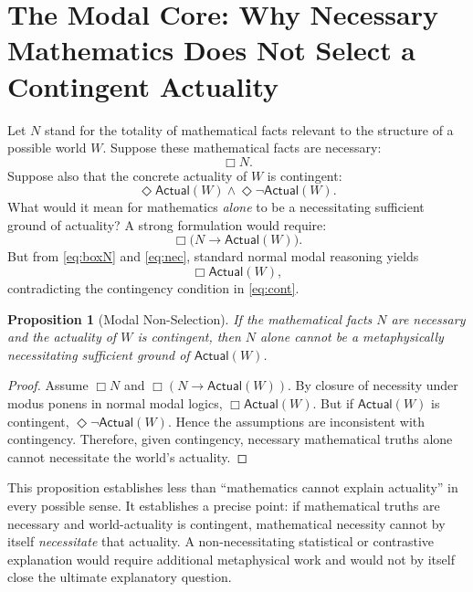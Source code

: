 \documentclass[11pt,letterpaper]{article}
\theoremstyle{plain}
\newtheorem{proposition}{Proposition}
\theoremstyle{definition}
\newcommand{\Actual}{\mathsf{Actual}}
\begin{document}
\section{The Modal Core: Why Necessary Mathematics Does Not Select a Contingent Actuality}
\label{sec:modalcore}

Let $N$ stand for the totality of mathematical facts relevant to the structure of a possible world $W$. Suppose these mathematical facts are necessary:
\begin{equation}\label{eq:boxN}
  \Box N.
\end{equation}
Suppose also that the concrete actuality of $W$ is contingent:
\begin{equation}\label{eq:cont}
  \Diamond \Actual(W) \land \Diamond \neg \Actual(W).
\end{equation}
What would it mean for mathematics \emph{alone} to be a necessitating sufficient ground of actuality? A strong formulation would require:
\begin{equation}\label{eq:nec}
  \Box\bigl(N \to \Actual(W)\bigr).
\end{equation}
But from \eqref{eq:boxN} and \eqref{eq:nec}, standard normal modal reasoning yields
\[
  \Box \Actual(W),
\]
contradicting the contingency condition in \eqref{eq:cont}.

\begin{proposition}[Modal Non-Selection]\label{prop:nonselection}
If the mathematical facts $N$ are necessary and the actuality of $W$ is contingent, then $N$ alone cannot be a metaphysically necessitating sufficient ground of $\Actual(W)$.
\end{proposition}

\begin{proof}
Assume $\Box N$ and $\Box(N \to \Actual(W))$. By closure of necessity under modus ponens in normal modal logics, $\Box \Actual(W)$. But if $\Actual(W)$ is contingent, $\Diamond \neg \Actual(W)$. Hence the assumptions are inconsistent with contingency. Therefore, given contingency, necessary mathematical truths alone cannot necessitate the world's actuality.
\end{proof}

This proposition establishes less than ``mathematics cannot explain actuality'' in every possible sense. It establishes a precise point: if mathematical truths are necessary and world-actuality is contingent, mathematical necessity cannot by itself \emph{necessitate} that actuality. A non-necessitating statistical or contrastive explanation would require additional metaphysical work and would not by itself close the ultimate explanatory question.
\end{document}
